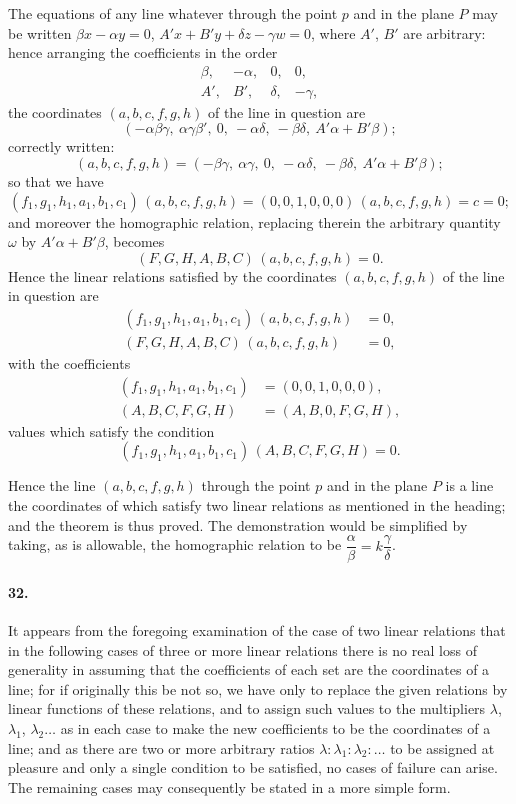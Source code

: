 \documentclass[11pt,a4paper]{article}
\begin{document}
The equations of any line whatever through the point $p$ and in the plane $P$
may be written $\beta x - \alpha y = 0$, $A'x + B'y + \delta z - \gamma w = 0$, where $A'$, $B'$ are arbitrary:
hence arranging the coefficients in the order
\[
\begin{array}{cccc}
\beta, & -\alpha, & 0, & 0, \\
A', & B', & \delta, & -\gamma,
\end{array}
\]
the coordinates $(a,b,c,f,g,h)$ of the line in question are
\[
(-\alpha\beta\gamma,\ \alpha\gamma\beta',\ 0,\ -\alpha\delta,\ -\beta\delta,\ A'\alpha + B'\beta);
\]
correctly written:
\[
(a,b,c,f,g,h) = (-\beta\gamma,\ \alpha\gamma,\ 0,\ -\alpha\delta,\ -\beta\delta,\ A'\alpha + B'\beta);
\]
so that we have
\[
(f_1, g_1, h_1, a_1, b_1, c_1)\,(a,b,c,f,g,h)
 = (0,0,1,0,0,0)\,(a,b,c,f,g,h) = c = 0;
\]
and moreover the homographic relation, replacing therein the arbitrary quantity $\omega$ by
$A'\alpha + B'\beta$, becomes
\[
(F, G, H, A, B, C)\,(a,b,c,f,g,h) = 0.
\]
Hence the linear relations satisfied by the coordinates $(a,b,c,f,g,h)$ of the line in
question are
\begin{align*}
(f_1, g_1, h_1, a_1, b_1, c_1)\,(a,b,c,f,g,h) &= 0, \\
(F, G, H, A, B, C)\,(a,b,c,f,g,h) &= 0,
\end{align*}
with the coefficients
\begin{align*}
(f_1, g_1, h_1, a_1, b_1, c_1) &= (0,0,1,0,0,0), \\
(A, B, C, F, G, H) &= (A, B, 0, F, G, H),
\end{align*}
values which satisfy the condition
\[
(f_1, g_1, h_1, a_1, b_1, c_1)\,(A, B, C, F, G, H) = 0.
\]

Hence the line $(a,b,c,f,g,h)$ through the point $p$ and in the plane $P$ is a line
the coordinates of which satisfy two linear relations as mentioned in the heading; and
the theorem is thus proved. The demonstration would be simplified by taking, as is
allowable, the homographic relation to be $\dfrac{\alpha}{\beta} = k\dfrac{\gamma}{\delta}$.

\paragraph{32.}
It appears from the foregoing examination of the case of two linear relations
that in the following cases of three or more linear relations there is no real loss of
generality in assuming that the coefficients of each set are the coordinates of a line;
for if originally this be not so, we have only to replace the given relations by linear
functions of these relations, and to assign such values to the multipliers
$\lambda$, $\lambda_1$, $\lambda_2 \ldots$ as in each case to make the new coefficients to be the coordinates
of a line; and as there are two or more arbitrary ratios $\lambda : \lambda_1 : \lambda_2 : \ldots$ to be
assigned at pleasure and only a single condition to be satisfied, no cases of failure can
arise. The remaining cases may consequently be stated in a more simple form.
\end{document}
